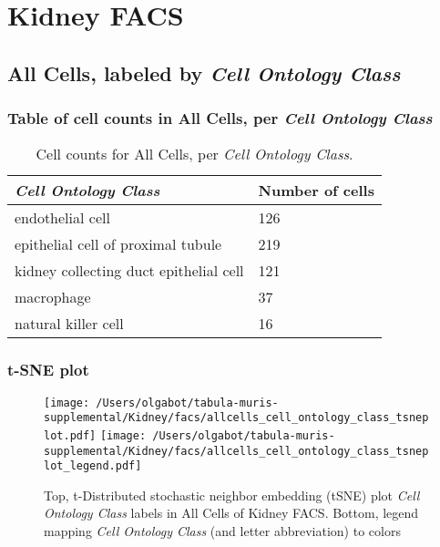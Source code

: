 \clearpage
\section{Kidney FACS}

\subsection{All Cells, labeled by \emph{Cell Ontology Class}}
\subsubsection{Table of cell counts in All Cells, per \emph{Cell Ontology Class}}\begin{table}[h]
\centering
\label{my-label}
\begin{tabular}{@{}ll@{}}
\toprule

\emph{Cell Ontology Class}& Number of cells \\ \midrule
endothelial cell & 126 \\

epithelial cell of proximal tubule & 219 \\

kidney collecting duct epithelial cell & 121 \\

macrophage & 37 \\

natural killer cell & 16 \\
\bottomrule
\end{tabular}
\caption{Cell counts for All Cells, per \emph{Cell Ontology Class}.}
\end{table}

\clearpage
\subsubsection{t-SNE plot}
\begin{figure}[h]
\centering
\texttt{[image: /Users/olgabot/tabula-muris-supplemental/Kidney/facs/allcells\_cell\_ontology\_class\_tsneplot.pdf]}
\texttt{[image: /Users/olgabot/tabula-muris-supplemental/Kidney/facs/allcells\_cell\_ontology\_class\_tsneplot\_legend.pdf]}
\caption{Top, t-Distributed stochastic neighbor embedding (tSNE) plot  \emph{Cell Ontology Class} labels in All Cells of Kidney FACS. Bottom, legend mapping \emph{Cell Ontology Class} (and letter abbreviation) to colors}
\end{figure}


